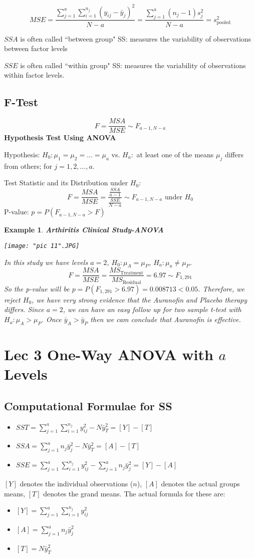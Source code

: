 \documentclass[a4paper,11pt]{article}
\newtheorem{eg}[thm]{Example}
\begin{document}
$$MSE=\frac{\sum_{j=1}^a\sum_{i=1}^{n_j}(y_{ij}-\bar{y}_j)^2}{N-a}=\frac{\sum_{j=1}^a(n_j-1)s_j^2}{N-a}=s_{\text{pooled}}^2$$

$SSA$ is often called ``between group" SS: measures the variability of observations between factor levels

$SSE$ is often called ``within group" SS: measures the variability of observations within factor levels. 
\newpage
\subsection{F-Test}
$$F=\frac{MSA}{MSE}\sim F_{a-1,N-a}$$
\textbf{Hypothesis Test Using ANOVA}

Hypothesis: $H_0:\mu_1=\mu_2=...=\mu_a$ vs. $H_a:$ at least one of the means $\mu_j$ differs from others; for $j=1,2,...,a$. 

Test Statistic and its Distribution under $H_0$: 
$$F=\frac{MSA}{MSE}=\frac{\frac{SSA}{a-1}}{\frac{SSE}{N-a}}\sim F_{a-1,N-a}\text{\ under }H_0$$
P-value: $p=P(F_{a-1,N-a}>F)$

\begin{eg}
\normalfont
\textbf{Arthiritis Clinical Study-ANOVA}

\begin{center}
	\texttt{[image: "pic 11".JPG]}
\end{center}

In this study we have levels $a=2$, $H_0: \mu_A=\mu_P$, $H_a: \mu_a\neq \mu_P$. 
$$F=\frac{MSA}{MSE}=\frac{MS_{\text{Treatment}}}{MS_{\text{Residual}}}=6.97\sim F_{1,291}$$
So the p-value will be $p=P(F_{1,291}>6.97)=0.008713<0.05$. Therefore, we reject $H_0$, we have very strong evidence that the Auranofin and Placebo therapy differs. Since $a=2$, we can have an easy follow up for two sample t-test with $H_a:\mu_A>\mu_P$. Once $\bar{y}_A>\bar{y}_P$ then we cam conclude that Auranofin is effective. 
\end{eg}

\section{Lec 3 One-Way ANOVA with $a$ Levels}
\subsection{Computational Formulae for SS}
\begin{itemize}
\item $SST=\sum_{j=1}^a\sum_{i=1}^{n_j}y_{ij}^2-N\bar{y}_T^2=[Y]-[T]$
\item $SSA=\sum_{j=1}^an_j\bar{y}_j^2-N\bar{y}_T^2=[A]-[T]$
\item $SSE=\sum_{j=1}^a\sum_{i=1}^{n_j}y_{ij}^2-\sum_{j=1}^an_j\bar{y}_j^2=[Y]-[A]$
\end{itemize}
$[Y]$ denotes the individual observations ($n$), $[A]$ denotes the actual groups means, $[T]$ denotes the grand means. The actual formula for these are:
\begin{itemize}
\item $[Y]=\sum_{j=1}^a\sum_{i=1}^{n_j}y_{ij}^2$
\item $[A]=\sum_{j=1}^an_j\bar{y}_j^2$
\item $[T]=N\bar{y}_T^2$
\end{itemize}
\end{document}
